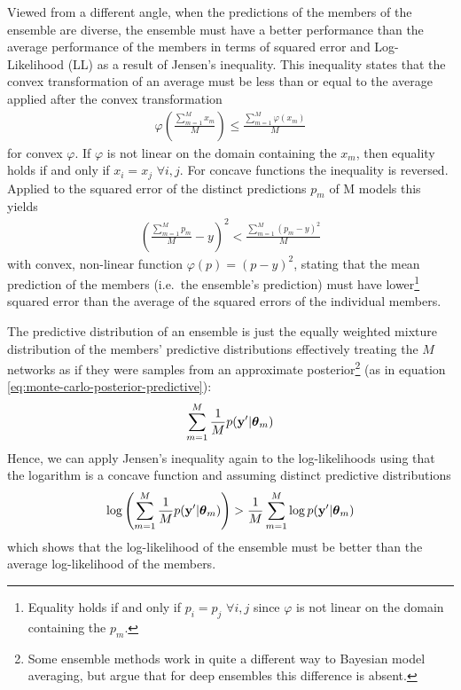 \documentclass[../thesis.tex]{subfiles}
\begin{document}
Viewed from a different angle, when the predictions of the members of the ensemble are diverse, the ensemble must have a better performance than the average performance of the members in terms of squared error and Log-Likelihood (LL) as a result of Jensen's inequality. This inequality states that the convex transformation of an average must be less than or equal to the average applied after the convex transformation
\begin{equation}
    \begin{split}
        \varphi\left(\frac{\sum_{m=1}^M x_m} {M}\right) \le \frac{\sum_{m=1}^M \varphi(x_m)}{M} 
    \end{split}
\end{equation}
for convex $\varphi$. If $\varphi$ is not linear on the domain containing the $x_m$, then equality holds if and only if $x_i=x_j$ $\forall i, j$. For concave functions the inequality is reversed. Applied to the squared error of the distinct predictions $p_m$ of M models this yields
\begin{equation}
    \begin{split}
        \left(\frac{\sum_{m=1}^M p_m}{M} - y\right)^2  < \frac{\sum_{m=1}^M (p_m - y)^2}{M}
    \end{split}
\end{equation}
with convex, non-linear function $\varphi(p) = (p-y)^2$, stating that the mean prediction of the members (i.e.\ the ensemble's prediction) must have lower\footnote{Equality holds if and only if $p_i=p_j$ $\forall i, j$ since $\varphi$ is not linear on the domain containing the $p_m$.} squared error than the average of the squared errors of the individual members. 

The predictive distribution of an ensemble is just the equally weighted mixture distribution of the members' predictive distributions effectively treating the $M$ networks as if they were samples from an approximate posterior\footnote{Some ensemble methods work in quite a different way to Bayesian model averaging, but \textcite{wilson2020case} argue that for deep ensembles this difference is absent.} (as in equation \ref{eq:monte-carlo-posterior-predictive}):
\begin{equation}
    \begin{split}
        \sum_{m=1}^M \frac{1}{M} p(\boldsymbol{\mathbf{y}}' | \boldsymbol{\mathbf{\theta}}_m)
    \end{split}
\end{equation}
Hence, we can apply Jensen's inequality again to the log-likelihoods using that the logarithm is a concave function and assuming distinct predictive distributions
\begin{equation}
    \begin{split}
        \log\left(\sum_{m=1}^M \frac{1}{M} p(\boldsymbol{\mathbf{y}}' | \boldsymbol{\mathbf{\theta}}_m)\right)  >  \frac{1}{M} \sum_{m=1}^M \log p(\boldsymbol{\mathbf{y}}' | \boldsymbol{\mathbf{\theta}}_m)
    \end{split}
\end{equation}
which shows that the log-likelihood of the ensemble must be better than the average log-likelihood of the members.
\end{document}
